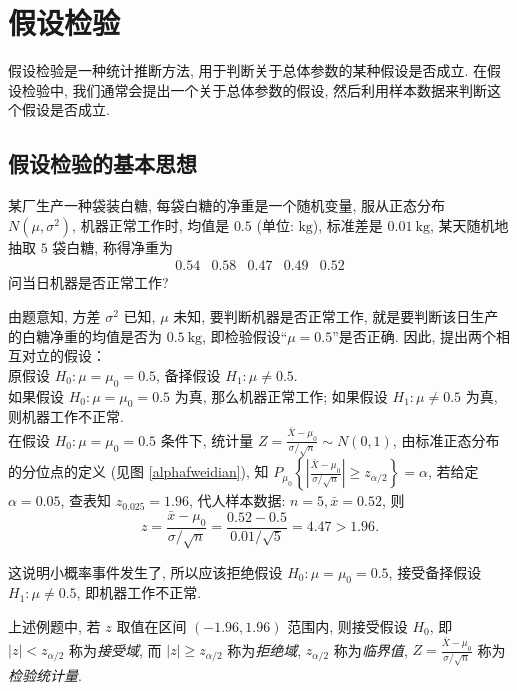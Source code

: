 \section{假设检验}

假设检验是一种统计推断方法, 用于判断关于总体参数的某种假设是否成立. 在假设检验中, 我们通常会提出一个关于总体参数的假设, 然后利用样本数据来判断这个假设是否成立. 

\subsection{假设检验的基本思想}

\begin{example}
    某厂生产一种袋装白糖, 每袋白糖的净重是一个随机变量, 服从正态分布 $ N\left(\mu, \sigma^{2}\right)$, \label{baitjq}
    机器正常工作时, 均值是 $0.5$ (单位: $ \mathrm{kg}$), 标准差是 $ 0.01 \mathrm{~kg}$, 某天随机地抽取 $5$ 袋白糖, 称得净重为
    $$\begin{array}{lllll}
            0.54 & 0.58 & 0.47 & 0.49 & 0.52
        \end{array}$$
    问当日机器是否正常工作?
\end{example}
\begin{solution}
    由题意知, 方差 $ \sigma^{2} $ 已知, $\mu $ 未知, 要判断机器是否正常工作, 就是要判断该日生产的白糖净重的均值是否为 $ 0.5 \mathrm{~kg} $, 
    即检验假设“$\mu=0.5$”是否正确. 因此, 提出两个相互对立的假设：\\
    原假设 $ H_{0}: \mu=\mu_{0}=0.5 $, 备择假设 $ H_{1}: \mu \neq 0.5 .$\\
    如果假设 $ H_{0}: \mu=\mu_{0}=0.5 $ 为真, 那么机器正常工作; 如果假设 $ H_{1}: \mu \neq 0.5 $ 为真, 则机器工作不正常.\\
    在假设 $ H_{0}: \mu=\mu_{0}=0.5 $ 条件下, 统计量 $\displaystyle Z=\frac{\bar{X}-\mu_{0}}{\sigma / \sqrt{n}} \sim N(0,1) $, 
    由标准正态分布的分位点的定义 (见图 \ref{alphafweidian}), 知 $ P_{\mu_{0}}\left\{\left|\frac{\bar{X}-\mu_{0}}{\sigma / \sqrt{n}}\right| \geqslant z_{\alpha / 2}\right\}=\alpha $, 
    若给定 $ \alpha=0.05$, 查表知 $ z_{0.025}=1.96$, 代人样本数据: $ n=5, \bar{x}=0.52 $, 
    则 $$\displaystyle z=\frac{\bar{x}-\mu_{0}}{\sigma / \sqrt{n}}=\frac{0.52-0.5}{0.01 / \sqrt{5}}=4.47>1.96 .$$

    这说明小概率事件发生了, 所以应该拒绝假设 $ H_{0}: \mu=\mu_{0}=0.5 $, 接受备择假设 $ H_{1}: \mu \neq 0.5 $, 即机器工作不正常.
\end{solution}

\begin{definition}[接收域和拒绝域]
    上述例题中, 若 $ z $ 取值在区间 $ (-1.96,1.96) $ 范围内, 则接受假设 $ H_{0} $, 即 $ |z|<z_{\alpha / 2} $ 称为\textit{接受域}, 
    而 $ |z| \geqslant z_{\alpha / 2} $ 称为\textit{拒绝域}, $z_{\alpha / 2} $ 称为\textit{临界值}, $\displaystyle Z=\frac{\bar{X}-\mu_{0}}{\sigma / \sqrt{n}} $ 称为\textit{检验统计量}.
\end{definition}

